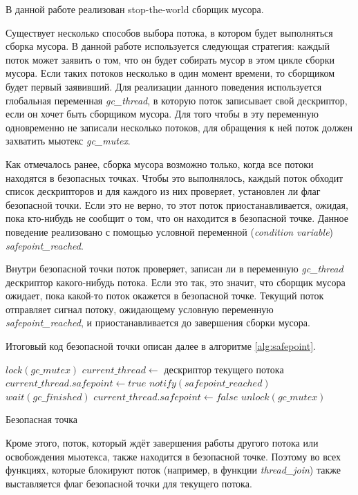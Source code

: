 \documentclass[14pt]{matmex-diploma}
\begin{document}
В данной работе реализован stop-the-world сборщик мусора.

Существует несколько способов выбора потока, в котором будет выполняться сборка мусора. В данной работе используется следующая стратегия: каждый поток может заявить о том, что он будет собирать мусор в этом цикле сборки мусора. Если таких потоков несколько в один момент времени, то сборщиком будет первый заявивший. Для реализации данного поведения используется глобальная переменная \textit{gc\_thread}, в которую поток записывает свой дескриптор, если он хочет быть сборщиком  мусора. Для того чтобы в эту переменную одновременно не записали несколько потоков, для обращения к ней поток должен захватить мьютекс \textit{gc\_mutex}. 

Как отмечалось ранее, сборка мусора возможно только, когда все потоки находятся в безопасных точках. Чтобы это выполнялось, каждый поток обходит список дескрипторов и для каждого из них проверяет, установлен ли флаг безопасной точки. Если это не верно, то этот поток приостанавливается, ожидая, пока кто-нибудь не сообщит о том, что он находится в безопасной точке. Данное поведение реализовано с помощью условной переменной (\textit{condition variable}) \textit{safepoint\_reached}.

Внутри безопасной точки поток проверяет, записан ли в переменную \textit{gc\_thread} дескриптор какого-нибудь потока. Если это так, это значит, что сборщик мусора ожидает, пока какой-то поток окажется в безопасной точке. Текущий поток отправляет сигнал потоку, ожидающему условную переменную \textit{safepoint\_reached}, и приостанавливается до завершения сборки мусора. 

Итоговый код безопасной точки описан далее в алгоритме \ref{alg:safepoint}.

\begin{algorithm}[h]
\begin{algorithmic}[1]
\State $lock(gc\_mutex)$
\State $current\_thread \gets$ дескриптор текущего потока
\State $current\_thread.safepoint \gets true$
    \State $notify(safepoint\_reached)$
    \State $wait(gc\_finished)$
\EndIf
\State $current\_thread.safepoint \gets false$
\State $unlock(gc\_mutex)$
\end{algorithmic}
\caption{Безопасная точка}\label{alg:safepoint}
\end{algorithm}

Кроме этого, поток, который ждёт завершения работы другого потока или освобождения мьютекса, также находится в безопасной точке. Поэтому во всех функциях, которые блокируют поток (например, в функции \textit{thread\_join}) также выставляется флаг безопасной точки для текущего потока.
\end{document}
